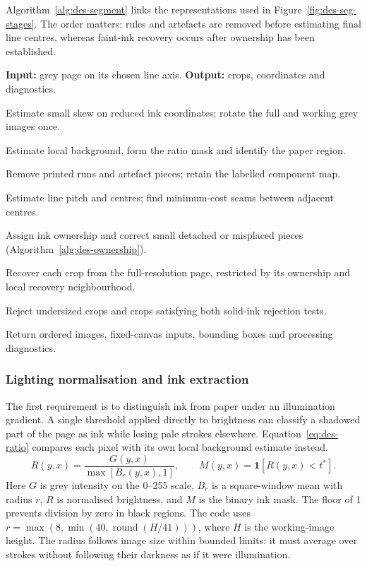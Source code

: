 Algorithm~\ref{alg:des-segment} links the representations used in Figure~\ref{fig:des-seg-stages}. The order matters: rules and artefacts are removed before estimating final line centres, whereas faint-ink recovery occurs after ownership has been established.
\begin{designalgorithm}
\caption{Photographed page to ordered line crops}
\label{alg:des-segment}
\textbf{Input:} grey page on its chosen line axis. \textbf{Output:} crops, coordinates and diagnostics.
\begin{designsteps}
\item Estimate small skew on reduced ink coordinates; rotate the full and working grey images once.
\item Estimate local background, form the ratio mask and identify the paper region.
\item Remove printed runs and artefact pieces; retain the labelled component map.
\item Estimate line pitch and centres; find minimum-cost seams between adjacent centres.
\item Assign ink ownership and correct small detached or misplaced pieces (Algorithm~\ref{alg:des-ownership}).
\item Recover each crop from the full-resolution page, restricted by its ownership and local recovery neighbourhood.
\item Reject undersized crops and crops satisfying both solid-ink rejection tests.
\item Return ordered images, fixed-canvas inputs, bounding boxes and processing diagnostics.
\end{designsteps}
\end{designalgorithm}

\subsubsection{Lighting normalisation and ink extraction}
The first requirement is to distinguish ink from paper under an illumination gradient. A single threshold applied directly to brightness can classify a shadowed part of the page as ink while losing pale strokes elsewhere. Equation~\ref{eq:des-ratio} compares each pixel with its own local background estimate instead.
\begin{equation}
R(y,x)=\frac{G(y,x)}{\max[B_r(y,x),1]},\qquad
M(y,x)=\mathbf{1}[R(y,x)<t^*].
\label{eq:des-ratio}
\end{equation}
Here $G$ is grey intensity on the 0--255 scale, $B_r$ is a square-window mean with radius $r$, $R$ is normalised brightness, and $M$ is the binary ink mask. The floor of 1 prevents division by zero in black regions. The code uses $r=\max(8,\min(40,\operatorname{round}(H/41)))$, where $H$ is the working-image height. The radius follows image size within bounded limits: it must average over strokes without following their darkness as if it were illumination.

